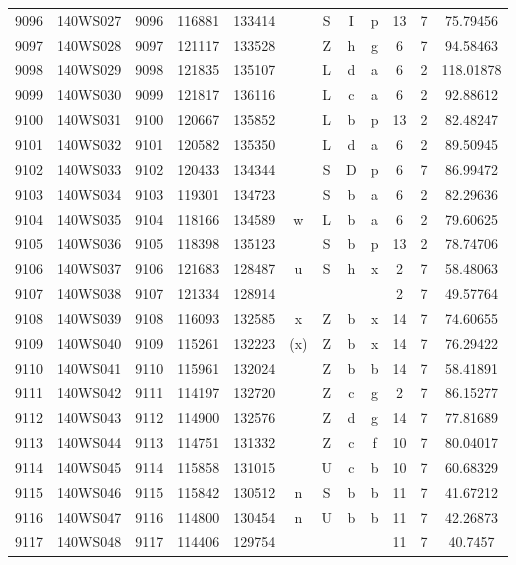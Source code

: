 \begin{tabular}{|*{12}{c|}}
9096 & 140WS027 & 9096 & 116881 & 133414 &  & S & I & p & 13 & 7 & 75.79456 \\ 
9097 & 140WS028 & 9097 & 121117 & 133528 &  & Z & h & g & 6 & 7 & 94.58463 \\ 
9098 & 140WS029 & 9098 & 121835 & 135107 &  & L & d & a & 6 & 2 & 118.01878 \\ 
9099 & 140WS030 & 9099 & 121817 & 136116 &  & L & c & a & 6 & 2 & 92.88612 \\ 
9100 & 140WS031 & 9100 & 120667 & 135852 &  & L & b & p & 13 & 2 & 82.48247 \\ 
9101 & 140WS032 & 9101 & 120582 & 135350 &  & L & d & a & 6 & 2 & 89.50945 \\ 
9102 & 140WS033 & 9102 & 120433 & 134344 &  & S & D & p & 6 & 7 & 86.99472 \\ 
9103 & 140WS034 & 9103 & 119301 & 134723 &  & S & b & a & 6 & 2 & 82.29636 \\ 
9104 & 140WS035 & 9104 & 118166 & 134589 & w & L & b & a & 6 & 2 & 79.60625 \\ 
9105 & 140WS036 & 9105 & 118398 & 135123 &  & S & b & p & 13 & 2 & 78.74706 \\ 
9106 & 140WS037 & 9106 & 121683 & 128487 & u & S & h & x & 2 & 7 & 58.48063 \\ 
9107 & 140WS038 & 9107 & 121334 & 128914 &  &  &  &  & 2 & 7 & 49.57764 \\ 
9108 & 140WS039 & 9108 & 116093 & 132585 & x & Z & b & x & 14 & 7 & 74.60655 \\ 
9109 & 140WS040 & 9109 & 115261 & 132223 & (x) & Z & b & x & 14 & 7 & 76.29422 \\ 
9110 & 140WS041 & 9110 & 115961 & 132024 &  & Z & b & b & 14 & 7 & 58.41891 \\ 
9111 & 140WS042 & 9111 & 114197 & 132720 &  & Z & c & g & 2 & 7 & 86.15277 \\ 
9112 & 140WS043 & 9112 & 114900 & 132576 &  & Z & d & g & 14 & 7 & 77.81689 \\ 
9113 & 140WS044 & 9113 & 114751 & 131332 &  & Z & c & f & 10 & 7 & 80.04017 \\ 
9114 & 140WS045 & 9114 & 115858 & 131015 &  & U & c & b & 10 & 7 & 60.68329 \\ 
9115 & 140WS046 & 9115 & 115842 & 130512 & n & S & b & b & 11 & 7 & 41.67212 \\ 
9116 & 140WS047 & 9116 & 114800 & 130454 & n & U & b & b & 11 & 7 & 42.26873 \\ 
9117 & 140WS048 & 9117 & 114406 & 129754 &  &  &  &  & 11 & 7 & 40.7457 \\ 

\end{tabular}
